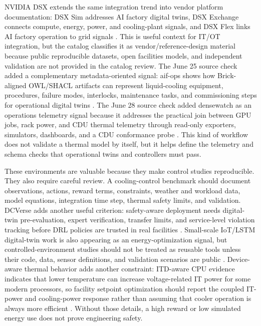 \documentclass[11pt]{article}
\begin{document}
NVIDIA DSX extends the same integration trend into vendor platform documentation: DSX Sim addresses AI factory digital twins, DSX Exchange connects compute, energy, power, and cooling-plant signals, and DSX Flex links AI factory operation to grid signals \cite{NVIDIADSX2026}. This is useful context for IT/OT integration, but the catalog classifies it as vendor/reference-design material because public reproducible datasets, open facilities models, and independent validation are not provided in the catalog review. The June 25 source check added a complementary metadata-oriented signal: aif-ops shows how Brick-aligned OWL/SHACL artifacts can represent liquid-cooling equipment, procedures, failure modes, interlocks, maintenance tasks, and commissioning steps for operational digital twins \cite{VisumAIFOps2026}. The June 28 source check added densewatch as an operations telemetry signal because it addresses the practical join between GPU jobs, rack power, and CDU thermal telemetry through read-only exporters, simulators, dashboards, and a CDU conformance probe \cite{Densewatch2026}. This kind of workflow does not validate a thermal model by itself, but it helps define the telemetry and schema checks that operational twins and controllers must pass.

These environments are valuable because they make control studies reproducible. They also require careful review. A cooling-control benchmark should document observations, actions, reward terms, constraints, weather and workload data, model equations, integration time step, thermal safety limits, and validation. DCVerse adds another useful criterion: safety-aware deployment needs digital-twin pre-evaluation, expert verification, transfer limits, and service-level violation tracking before DRL policies are trusted in real facilities \cite{ZhangDCVerse2026}. Small-scale IoT/LSTM digital-twin work is also appearing as an energy-optimization signal, but controlled-environment studies should not be treated as reusable tools unless their code, data, sensor definitions, and validation scenarios are public \cite{GoncalvesScalableTwin2026}. Device-aware thermal behavior adds another constraint: ITD-aware CPU evidence indicates that lower temperature can increase voltage-related IT power for some modern processors, so facility setpoint optimization should report the coupled IT-power and cooling-power response rather than assuming that cooler operation is always more efficient \cite{CropITD2026}. Without those details, a high reward or low simulated energy use does not prove engineering safety.
\end{document}
